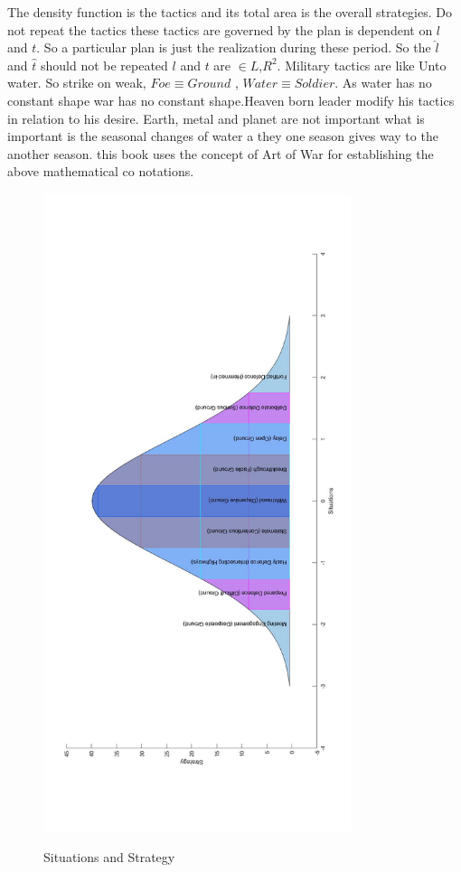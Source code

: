 \documentclass[]{article}
\begin{document}
The density function is the tactics and its total area is the overall strategies. Do not repeat the tactics these tactics are governed by the plan is dependent on $l$ and $t$. So a particular plan is just the realization during these period. So the $\hat{l}$ and $\hat{t}$ should not be repeated $l$  and $t$ are $\in {L}$,${R}^2$. Military tactics are like Unto water. So strike on weak, $Foe \equiv Ground$ , $Water \equiv Soldier$. As water has no constant shape war has no constant shape.Heaven born leader modify his tactics in relation to his desire. Earth, metal and planet are not important what is important is the seasonal changes of water a they one season gives way to the another season. this book uses the concept of Art of War \autocite{tzu2020art} for establishing the above mathematical co notations.
\begin{figure}
  

  
  \includegraphics[width=9cm]{situationsvsstrategy.jpg}\\
  \centering
  \caption{Situations and Strategy}
\end{figure}
\end{document}
